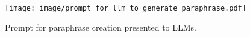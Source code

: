 \begin{figure}[t]
 \centering
  \texttt{[image: image/prompt\_for\_llm\_to\_generate\_paraphrase.pdf]}
 \caption{Prompt for paraphrase creation presented to LLMs.}
 \label{fig:prompt_for_paraphrase_creation_llm}
\end{figure}